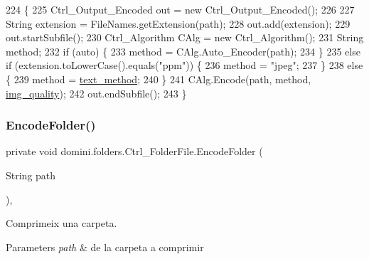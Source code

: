 \begin{DoxyCode}
224                                          \{
225         Ctrl\_Output\_Encoded out = \textcolor{keyword}{new} Ctrl\_Output\_Encoded();
226 
227         String extension = FileNames.getExtension(path);
228         out.add(extension);
229         out.startSubfile();
230         Ctrl\_Algorithm CAlg = \textcolor{keyword}{new} Ctrl\_Algorithm();
231         String method;
232         \textcolor{keywordflow}{if} (\textcolor{keyword}{auto}) \{
233             method = CAlg.Auto\_Encoder(path);
234         \}
235         \textcolor{keywordflow}{else} \textcolor{keywordflow}{if} (extension.toLowerCase().equals(\textcolor{stringliteral}{"ppm"})) \{
236             method = \textcolor{stringliteral}{"jpeg"};
237         \}
238         \textcolor{keywordflow}{else} \{
239             method = \hyperlink{classdomini_1_1folders_1_1Ctrl__FolderFile_a75ef571be454360b835f552d2cf20741}{text\_method};
240         \}
241         CAlg.Encode(path, method, \hyperlink{classdomini_1_1folders_1_1Ctrl__FolderFile_a7990a74c394d53a58ebbf4a7872c700d}{img\_quality});
242         out.endSubfile();
243     \}
\end{DoxyCode}
\mbox{\label{classdomini_1_1folders_1_1Ctrl__FolderFile_a6b18175639009f0186307710fb88a18f}} 
\subsubsection{\texorpdfstring{Encode\+Folder()}{EncodeFolder()}}
{\footnotesize\ttfamily private void domini.\+folders.\+Ctrl\+\_\+\+Folder\+File.\+Encode\+Folder (\begin{DoxyParamCaption}\item[{String}]{path }\end{DoxyParamCaption})\hspace{0.3cm}{\ttfamily [inline]}, {\ttfamily [private]}}



Comprimeix una carpeta. 


\begin{DoxyParams}{Parameters}
{\em path} & de la carpeta a comprimir \\
\hline
\end{DoxyParams}

